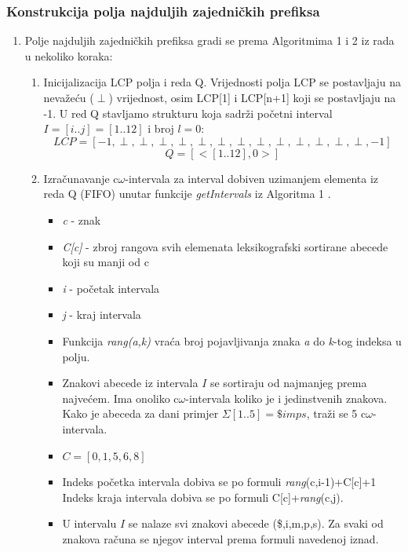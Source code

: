 \documentclass[a4paper,12pt]{article}
\begin{document}

\subsubsection{Konstrukcija polja najduljih zajedničkih prefiksa}

\begin{enumerate}
	\item Polje najduljih zajedničkih prefiksa gradi se prema Algoritmima 1 i 2 iz rada \cite{beller2013} u nekoliko koraka:

	\begin{enumerate}
		\item Inicijalizacija LCP polja i reda Q. Vrijednosti polja LCP se postavljaju na nevažeću (\textbf{$\perp$}) vrijednost, osim LCP[1] i LCP[n+1] koji se postavljaju na -1. U red Q stavljamo strukturu koja sadrži početni interval $I = [i..j]=[1..12]$ i broj $\textit{l}=0$:\\
	 	$$LCP = [-1,\perp,\perp,\perp,\perp,\perp,\perp,\perp,\perp,\perp,\perp,\perp,\perp, \perp, -1]$$
		$$Q = [<[1..12],0>]$$
		\item Izračunavanje c$\omega$-intervala za interval dobiven uzimanjem elementa iz reda Q (FIFO) unutar funkcije \textit{getIntervals} iz Algoritma 1 \cite{beller2013}.
			\begin{itemize}
				\item \textit{c} - znak
				\item \textit{C[c]} - zbroj rangova svih elemenata leksikografski sortirane abecede koji su manji od c
			    \item \textit{i} - početak intervala
			    \item \textit{j} - kraj intervala
			    \item Funkcija \textit{rang(a,k)} vraća broj pojavljivanja znaka \textit{a} do \textit{k}-tog indeksa u polju. 
			    \item Znakovi abecede iz intervala $I$ se sortiraju od najmanjeg prema najvećem. Ima onoliko c$\omega$-intervala koliko je i jedinstvenih znakova. Kako je abeceda za dani primjer $\Sigma[1..5]=\$imps$, traži se 5 c$\omega$-intervala.
			    \item $C = [0,1,5,6,8]$
			    \item Indeks početka intervala dobiva se po formuli \textit{rang}(c,i-1)+C[c]+1 Indeks kraja intervala dobiva se po formuli C[c]+\textit{rang}(c,j).
			    \item U intervalu $I$ se nalaze svi znakovi abecede (\$,i,m,p,s). Za svaki od znakova računa se njegov interval prema formuli navedenoj iznad.

\end{itemize}
\end{enumerate}
\end{enumerate}
\end{document}
